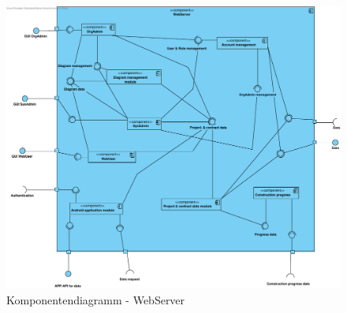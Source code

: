 \begin{figure}[H]
	\centering
	\includegraphics[width=16cm]{img/diagrams/Component-WebServer.pdf}	
	\caption{Komponentendiagramm - WebServer}
	\label{fig:komponentendiagramm-webserver}
\end{figure}

